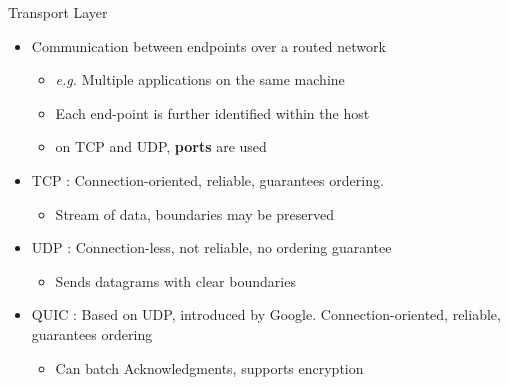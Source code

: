 \begin{frame}{Transport Layer}
	\begin{itemize}
		\item Communication between endpoints over a routed network
			\begin{itemize}
				\item \textit{e.g.} Multiple applications on the same machine
				\item Each end-point is further identified within the host 
				\item on TCP and UDP, \textbf{ports} are used
			\end{itemize}
		\item TCP : Connection-oriented, reliable, guarantees ordering.
			\begin{itemize}
				\item Stream of data, boundaries may be preserved
			\end{itemize}
		\item UDP : Connection-less, not reliable, no ordering guarantee
			\begin{itemize}
				\item Sends datagrams with clear boundaries
			\end{itemize}
		\item QUIC : Based on UDP, introduced by Google. Connection-oriented, reliable, guarantees ordering
			\begin{itemize}
				\item Can batch Acknowledgments, supports encryption
			\end{itemize}

	\end{itemize}
\end{frame}

